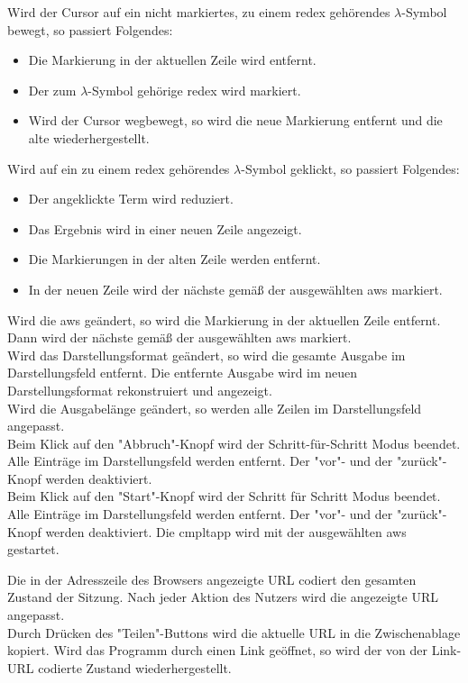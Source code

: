 \documentclass[parskip=full,11pt,twoside]{scrartcl}
\begin{document}
Wird der Cursor auf ein nicht markiertes, zu einem \gls{redex} gehörendes $\lambda$-Symbol bewegt, so passiert Folgendes:
\begin{itemize}
\item Die Markierung in der aktuellen Zeile wird entfernt.
\item Der zum $\lambda$-Symbol gehörige \gls{redex} wird markiert.
\item Wird der Cursor wegbewegt, so wird die neue Markierung entfernt und die alte wiederhergestellt.
\end{itemize}

Wird auf ein zu einem \gls{redex} gehörendes $\lambda$-Symbol geklickt, so passiert Folgendes:
\begin{itemize}
\item Der angeklickte Term wird reduziert.
\item Das Ergebnis wird in einer neuen Zeile angezeigt.
\item Die Markierungen in der alten Zeile werden entfernt.
\item In der neuen Zeile wird der nächste  gemäß der ausgewählten \gls{aws} markiert.
\end{itemize}

Wird die \gls{aws} geändert, so wird die Markierung in der aktuellen Zeile entfernt.
Dann wird der nächste  gemäß der ausgewählten \gls{aws} markiert.\\
Wird das Darstellungsformat geändert, so wird die gesamte Ausgabe im Darstellungsfeld entfernt.
Die entfernte Ausgabe wird im neuen Darstellungsformat rekonstruiert und angezeigt.\\
Wird die Ausgabelänge geändert, so werden alle Zeilen im Darstellungsfeld angepasst.\\
Beim Klick auf den "Abbruch"-Knopf wird der Schritt-für-Schritt Modus beendet.
Alle Einträge im Darstellungsfeld werden entfernt.
Der "vor"- und der "zurück"-Knopf werden deaktiviert.\\
Beim Klick auf den "Start"-Knopf wird der Schritt für Schritt Modus beendet.
Alle Einträge im Darstellungsfeld werden entfernt.
Der "vor"- und der "zurück"-Knopf werden deaktiviert.
Die \gls{cmpltapp} wird mit der ausgewählten \gls{aws} gestartet.

Die in der Adresszeile des Browsers angezeigte URL codiert den gesamten Zustand der Sitzung. 
Nach jeder Aktion des Nutzers wird die angezeigte URL angepasst.\\
Durch Drücken des "Teilen"-Buttons wird die aktuelle URL in die Zwischenablage kopiert.
Wird das Programm durch einen Link geöffnet, so wird der von der Link-URL codierte Zustand wiederhergestellt.
\end{document}
